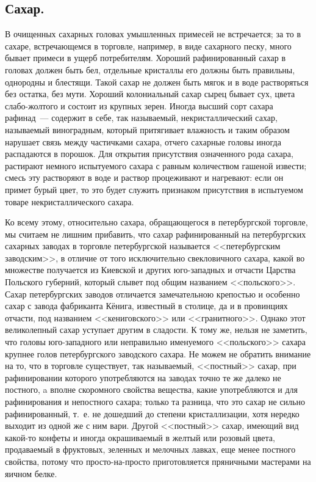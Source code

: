 \subsection{Сахар.}
В очищенных сахарных головах умышленных примесей не встречается; за то в сахаре, встречающемся в торговле, например, в виде сахарного песку, много бывает примеси в ущерб потребителям. Хороший рафинированный сахар в головах должен быть бел, отдельные кристаллы его должны быть правильны, однородны и блестящи. Такой сахар не должен быть мягок и в воде растворяться без остатка, без мути. Хороший колониальный сахар сырец бывает сух, цвета слабо-жолтого и состоит из крупных зерен. Иногда высший сорт сахара рафинад~--- содержит в себе, так называемый, некристаллический сахар, называемый виноградным, который притягивает влажность и таким образом нарушает связь между частичками сахара, отчего сахарные головы иногда распадаются в порошок. Для открытия присутствия означенного рода сахара, растирают немного испытуемого сахара с равным количеством гашеной извести; смесь эту растворяют в воде и раствор процеживают и нагревают: если он примет бурый цвет, то это будет служить признаком присутствия в испытуемом товаре некристаллического сахара.

Ко всему этому, относительно сахара, обращающегося в петербургской торговле, мы считаем не лишним прибавить, что сахар рафинированный на петербургских сахарных заводах в торговле петербургской называется <<петербургским заводским>>, в отличие от того исключительно свекловичного сахара, какой во множестве получается из Киевской и других юго-западных и отчасти Царства Польского губерний, который слывет под общим названием <<польского>>. Сахар петербургских заводов отличается замечательною крепостью и особенно сахар с завода фабриканта Кёнига, известный в столице, да и в провинциях отчасти, под названием <<кениговского>> или <<гранитного>>. Однако этот великолепный сахар уступает другим в сладости. К тому же, нельзя не заметить, что головы юго-западного или неправильно именуемого <<польского>> сахара крупнее голов петербургского заводского сахара. Не можем не обратить внимание на то, что в торговле существует, так называемый, <<постный>> сахар, при рафинировании которого употребляются на заводах точно те же далеко не постного, a вполне скоромного свойства вещества, какие употребляются и для рафинирования и непостного сахара; только та разница, что это сахар не сильно рафинированный, т.~е. не дошедший до степени кристаллизации, хотя нередко выходит из одной же с ним вари. Другой <<постный>> сахар, имеющий вид какой-то конфеты и иногда окрашиваемый в желтый или розовый цвета, продаваемый в фруктовых, зеленных и мелочных лавках, еще менее постного свойства, потому что просто-на-просто приготовляется пряничными мастерами на яичном белке.

